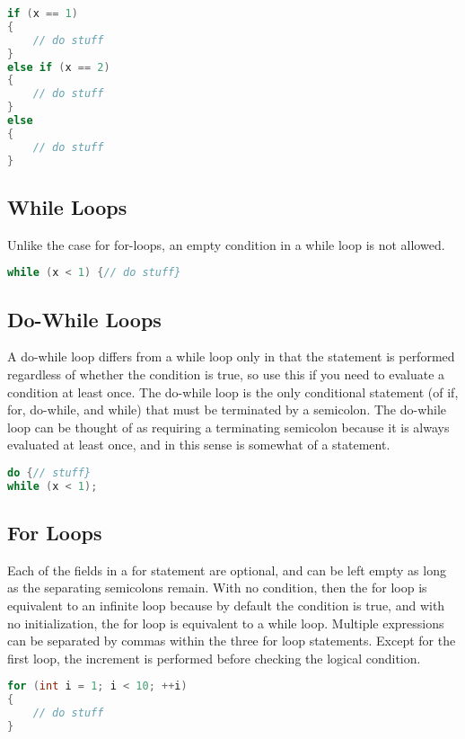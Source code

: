 \documentclass[10pt]{article}
\begin{document}
\begin{lstlisting}[language=C++]
if (x == 1)
{
	// do stuff
}
else if (x == 2)
{
	// do stuff
}
else
{
	// do stuff
}
\end{lstlisting}

\subsection{While Loops}

Unlike the case for for-loops, an empty condition in a while loop is not allowed.

\begin{lstlisting}[language=C++]
while (x < 1) {// do stuff}
\end{lstlisting}

\subsection{Do-While Loops}

A do-while loop differs from a while loop only in that the statement is performed regardless of whether the condition is true, so use this if you need to evaluate a condition at least once. The do-while loop is the only conditional statement (of if, for, do-while, and while) that must be terminated by a semicolon. The do-while loop can be thought of as requiring a terminating semicolon because it is always evaluated at least once, and in this sense is somewhat of a statement.

\begin{lstlisting}[language=C++]
do {// stuff}
while (x < 1);
\end{lstlisting}

\subsection{For Loops}

Each of the fields in a for statement are optional, and can be left empty as long as the separating semicolons remain. With no condition, then the for loop is equivalent to an infinite loop because by default the condition is true, and with no initialization, the for loop is equivalent to a while loop. Multiple expressions can be separated by commas within the three for loop statements. Except for the first loop, the increment is performed before checking the logical condition.

\begin{lstlisting}[language=C++]
for (int i = 1; i < 10; ++i)
{
    // do stuff
}
\end{lstlisting}
\end{document}
